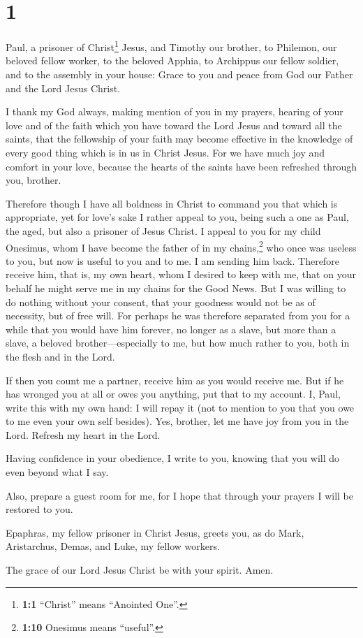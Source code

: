 \hypertarget{section}{%
\section{1}\label{section}}

 Paul, a prisoner of Christ\footnote{\textbf{1:1}
  ``Christ'' means ``Anointed One''.} Jesus, and Timothy our brother, to
Philemon, our beloved fellow worker,  to the beloved
Apphia, to Archippus our fellow soldier, and to the assembly in your
house:  Grace to you and peace from God our Father and the
Lord Jesus Christ.

 I thank my God always, making mention of you in my
prayers,  hearing of your love and of the faith which you
have toward the Lord Jesus and toward all the saints, 
that the fellowship of your faith may become effective in the knowledge
of every good thing which is in us in Christ Jesus.  For
we have much joy and comfort in your love, because the hearts of the
saints have been refreshed through you, brother.

 Therefore though I have all boldness in Christ to command
you that which is appropriate,  yet for love's sake I
rather appeal to you, being such a one as Paul, the aged, but also a
prisoner of Jesus Christ.  I appeal to you for my child
Onesimus, whom I have become the father of in my chains,\footnote{\textbf{1:10}
  Onesimus means ``useful''.}  who once was useless to
you, but now is useful to you and to me.  I am sending
him back. Therefore receive him, that is, my own heart, 
whom I desired to keep with me, that on your behalf he might serve me in
my chains for the Good News.  But I was willing to do
nothing without your consent, that your goodness would not be as of
necessity, but of free will.  For perhaps he was
therefore separated from you for a while that you would have him
forever,  no longer as a slave, but more than a slave, a
beloved brother---especially to me, but how much rather to you, both in
the flesh and in the Lord.

 If then you count me a partner, receive him as you would
receive me.  But if he has wronged you at all or owes you
anything, put that to my account.  I, Paul, write this
with my own hand: I will repay it (not to mention to you that you owe to
me even your own self besides).  Yes, brother, let me
have joy from you in the Lord. Refresh my heart in the Lord.

 Having confidence in your obedience, I write to you,
knowing that you will do even beyond what I say.

 Also, prepare a guest room for me, for I hope that
through your prayers I will be restored to you.

 Epaphras, my fellow prisoner in Christ Jesus, greets
you,  as do Mark, Aristarchus, Demas, and Luke, my fellow
workers.

 The grace of our Lord Jesus Christ be with your spirit.
Amen.
